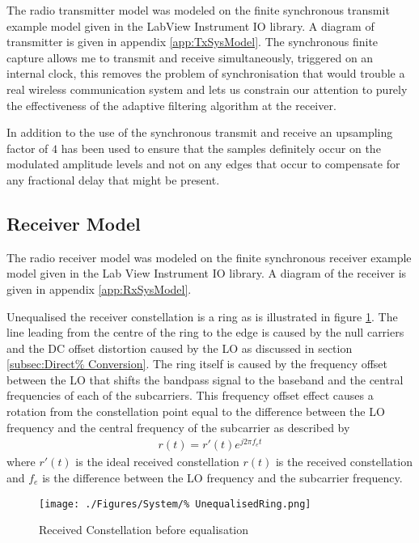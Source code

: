 The radio transmitter model was modeled on the finite %
synchronous transmit example model given in the LabView %
Instrument IO library. A diagram of transmitter is given %
in appendix \ref{app:TxSysModel}. %
The synchronous finite capture allows me to %
transmit and receive simultaneously, triggered on %
an internal clock, this removes the problem of %
synchronisation that would trouble a real %
wireless communication system and lets us %
constrain our attention to purely the effectiveness %
of the adaptive filtering algorithm at the receiver. %

In addition to the use of the synchronous transmit and %
receive an upsampling factor of $4$ has been used %
to ensure that the samples definitely occur on the %
modulated amplitude levels and not on any edges that %
occur to compensate for any fractional delay that %
might be present.


\subsection{Receiver Model}
\FloatBarrier
The radio receiver model was modeled on the finite %
synchronous receiver example model given in the Lab%
View Instrument IO library. A diagram of the receiver %
is given in appendix \ref{app:RxSysModel}. %

Unequalised the receiver constellation is a ring as is %
illustrated in figure \ref{fig:ReceivedRing}. The line %
leading from the centre of the ring to the edge is %
caused by the null carriers and the DC offset distortion %
caused by the LO as discussed in section \ref{subsec:Direct%
Conversion}. The ring itself is caused by the frequency offset %
between the LO that shifts the bandpass signal to the baseband %
and the central frequencies of each of the subcarriers. This %
frequency offset effect causes a rotation from the constellation %
point equal to the difference between the LO frequency and the %
central frequency of the subcarrier as described by 
\begin{align}
	r(t) = r'(t)e^{j 2\pi f_{e}t}
\end{align}
where $r'(t)$ is the ideal received constellation $r(t)$ is %
the received constellation and $f_{e}$ is the difference %
between the LO frequency and the subcarrier frequency.
\begin{figure}[ht]
	\centering
	\texttt{[image: ./Figures/System/\%
	UnequalisedRing.png]}
	\caption{Received Constellation before equalisation}
	\label{fig:ReceivedRing}
\end{figure}
\FloatBarrier
